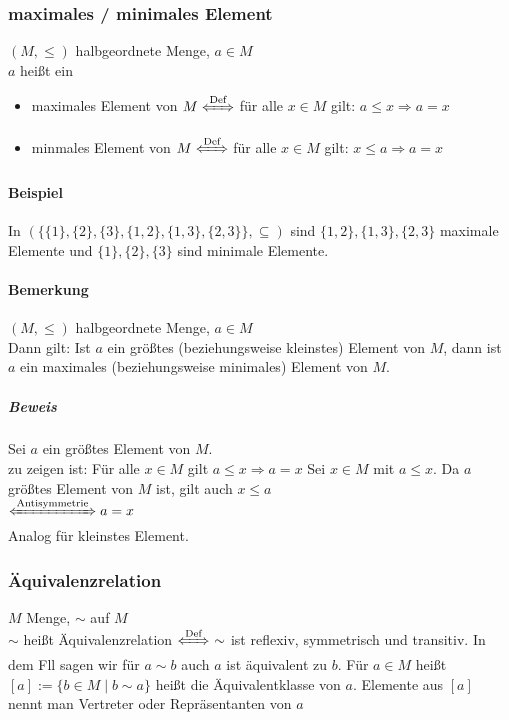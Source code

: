 \documentclass[a4paper]{scrartcl}
\begin{document}
\subsubsection{maximales / minimales Element}
\label{sec-2-5-5}
$(M,\leq)$ halbgeordnete Menge, $a\in M$ \\
    $a$ heißt ein
\begin{itemize}
\item maximales Element von $M \xLeftrightarrow{\text{Def}}$ für alle $x\in M$ gilt: $a\leq x \Rightarrow a = x$
\item minmales Element von $M \xLeftrightarrow{\text{Def}}$ für alle $x\in M$ gilt: $x\leq a \Rightarrow a = x$
\end{itemize}
\paragraph{Beispiel}
\label{sec-2-5-5-1}
In $(\{\{1\},\{2\},\{3\},\{1,2\},\{1,3\},\{2,3\}\}, \subseteq)$ sind $\{1,2\},\{1,3\},\{2,3\}$ maximale Elemente und $\{1\},\{2\},\{3\}$ sind minimale Elemente.
\paragraph{Bemerkung}
\label{sec-2-5-5-2}
$(M,\leq)$ halbgeordnete Menge, $a\in M$ \\
     Dann gilt: Ist $a$ ein größtes (beziehungsweise kleinstes) Element von $M$, dann ist $a$ ein maximales (beziehungsweise minimales) Element von $M$.
\subparagraph{Beweis}
\label{sec-2-5-5-2-1}
Sei $a$ ein größtes Element von $M$. \\
      zu zeigen ist: Für alle $x\in M$ gilt $a\leq x \Rightarrow a = x$
Sei $x\in M$ mit $a\leq x$. Da $a$ größtes Element von $M$ ist, gilt auch $x\leq a$ \\
      $\xLeftrightarrow{\text{Antisymmetrie}} a = x$ \\
      Analog für kleinstes Element.
\subsubsection{Äquivalenzrelation}
\label{sec-2-5-6}
$M$ Menge, $\sim$ auf $M$ \\
    $\sim$ heißt Äquivalenzrelation $\xLeftrightarrow{\text{Def}}~\sim$ ist reflexiv, symmetrisch und transitiv.
In dem Fll sagen wir für $a\sim b$ auch $a$ ist äquivalent zu $b$. Für $a\in M$ heißt $[a]:=\{b\in M \mid b\sim a\}$ heißt die Äquivalentklasse von $a$.
Elemente aus $[a]$ nennt man Vertreter oder Repräsentanten von $a$
\end{document}
